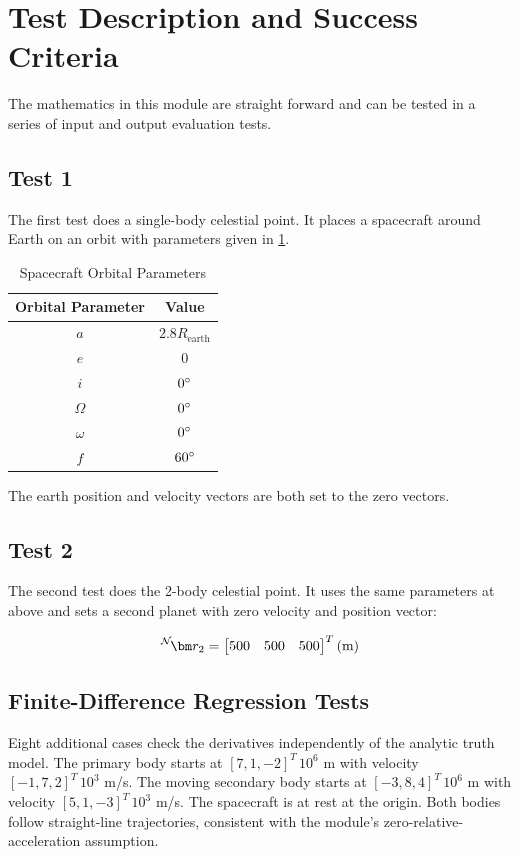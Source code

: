 

\section{Test Description and Success Criteria}
The mathematics in this module are straight forward and can be tested in a series of input and output evaluation tests.

\subsection{Test 1}
The first test does a single-body celestial point. It places a spacecraft around Earth on an orbit with parameters given in \ref{tab:orbitParams}.
\begin{table}[htbp]
	\caption{Spacecraft Orbital Parameters}
	\label{tab:orbitParams}
	\centering \fontsize{10}{10}\selectfont
	\begin{tabular}{ c | c } %
		\hline\hline
		\textbf{Orbital Parameter}  & \textbf{Value}  \\
		\hline
		$a$    		        	     &  $2.8 R_{\text{earth}}	$   \\
		$e$           &  $0  $ \\
		$i$  & $0 ^{\circ} $\\
		$\Omega$  & $0^{\circ}  $\\
		$\omega$  & $0^{\circ}$\\
		$f$  & $60 ^{\circ} $\\
		\hline\hline
	\end{tabular}
\end{table}
The earth position and velocity vectors are both set to the zero vectors.

\subsection{Test 2}
The second test does the 2-body celestial point. It uses the same parameters at above and sets a second planet with zero velocity and position vector:

\begin{equation}
\leftexp{N}{\bm r_2} = \begin{bmatrix}500 & 500 &500 \end{bmatrix}^T (\text{m})
\end{equation}

\subsection{Finite-Difference Regression Tests}
Eight additional cases check the derivatives independently of the analytic truth model. The primary body starts at $[7,1,-2]^T\,10^6$ m with velocity $[-1,7,2]^T\,10^3$ m/s. The moving secondary body starts at $[-3,8,4]^T\,10^6$ m with velocity $[5,1,-3]^T\,10^3$ m/s. The spacecraft is at rest at the origin. Both bodies follow straight-line trajectories, consistent with the module's zero-relative-acceleration assumption.

